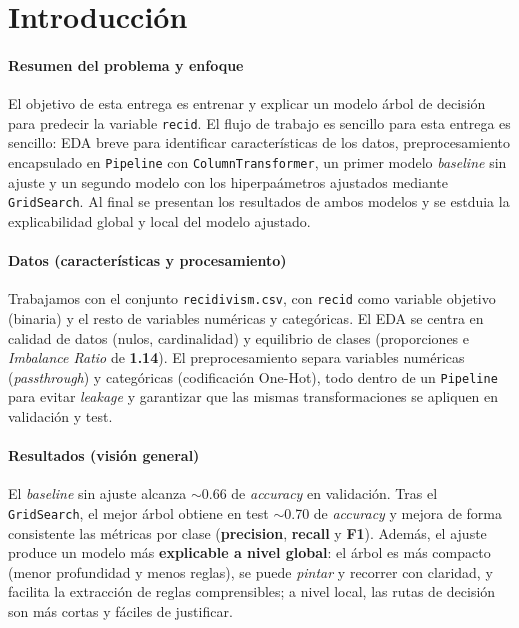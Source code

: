 \section{Introducción}

\paragraph{Resumen del problema y enfoque}

El objetivo de esta entrega es entrenar y explicar un modelo \de árbol de decisión para predecir la variable \texttt{recid}. El flujo de trabajo es sencillo para esta entrega es sencillo: EDA breve para identificar características de los datos, preprocesamiento encapsulado en \texttt{Pipeline} con \texttt{ColumnTransformer}, un primer modelo \emph{baseline} sin ajuste y un segundo modelo con los hiperpaámetros ajustados mediante \texttt{GridSearch}. Al final se presentan los resultados de ambos modelos y se estduia la explicabilidad global y local del modelo ajustado.

\paragraph{Datos (características y procesamiento)}
Trabajamos con el conjunto \texttt{recidivism.csv}, con \texttt{recid} como variable objetivo (binaria) y el resto de variables numéricas y categóricas. El EDA se centra en calidad de datos (nulos, cardinalidad) y equilibrio de clases (proporciones e \emph{Imbalance Ratio} de \textbf{1.14}). El preprocesamiento separa variables numéricas (\emph{passthrough}) y categóricas (codificación One-Hot), todo dentro de un \texttt{Pipeline} para evitar \emph{leakage} y garantizar que las mismas transformaciones se apliquen en validación y test.

\paragraph{Resultados (visión general)}
El \emph{baseline} sin ajuste alcanza \(\sim\)0.66 de \emph{accuracy} en validación. Tras el \texttt{GridSearch}, el mejor árbol obtiene en test \(\sim\)0.70 de \emph{accuracy} y mejora de forma consistente las métricas por clase (\textbf{precision}, \textbf{recall} y \textbf{F1}). Además, el ajuste produce un modelo más \textbf{explicable a nivel global}: el árbol es más compacto (menor profundidad y menos reglas), se puede \emph{pintar} y recorrer con claridad, y facilita la extracción de reglas comprensibles; a nivel local, las rutas de decisión son más cortas y fáciles de justificar.



